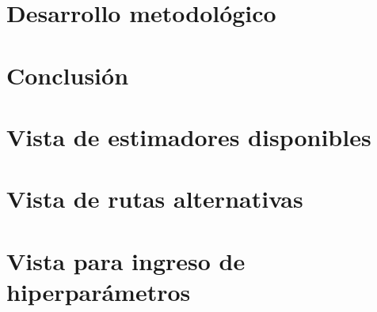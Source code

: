 \documentclass[stu, 12pt, noextraspace, floatsintext]{apa7}
\begin{document}
\clearpage
\section{Desarrollo metodológico}


\clearpage
\section{Conclusión}


\clearpage
\printbibliography[{heading=bibintoc}]
\thispagestyle{otherplain}

\appendix

\section{Vista de estimadores disponibles}


\section{Vista de rutas alternativas}


\section{Vista para ingreso de hiperparámetros}

\end{document}
